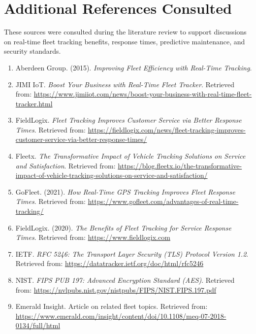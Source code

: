 \chapter{Additional References Consulted}

These sources were consulted during the literature review to support discussions on real-time fleet tracking benefits, response times, predictive maintenance, and security standards.

\begin{enumerate}
    \item Aberdeen Group. (2015). \textit{Improving Fleet Efficiency with Real-Time Tracking}.
    
    \item JIMI IoT. \textit{Boost Your Business with Real-Time Fleet Tracker}. Retrieved from: \url{https://www.jimiiot.com/news/boost-your-business-with-real-time-fleet-tracker.html}
    
    \item FieldLogix. \textit{Fleet Tracking Improves Customer Service via Better Response Times}. Retrieved from: \url{https://fieldlogix.com/news/fleet-tracking-improves-customer-service-via-better-response-times/}
    
    \item Fleetx. \textit{The Transformative Impact of Vehicle Tracking Solutions on Service and Satisfaction}. Retrieved from: \url{https://blog.fleetx.io/the-transformative-impact-of-vehicle-tracking-solutions-on-service-and-satisfaction/}
    
    \item GoFleet. (2021). \textit{How Real-Time GPS Tracking Improves Fleet Response Times}. Retrieved from: \url{https://www.gofleet.com/advantages-of-real-time-tracking/}
    
    \item FieldLogix. (2020). \textit{The Benefits of Fleet Tracking for Service Response Times}. Retrieved from: \url{https://www.fieldlogix.com}
    
    \item IETF. \textit{RFC 5246: The Transport Layer Security (TLS) Protocol Version 1.2}. Retrieved from: \url{https://datatracker.ietf.org/doc/html/rfc5246}
    
    \item NIST. \textit{FIPS PUB 197: Advanced Encryption Standard (AES)}. Retrieved from: \url{https://nvlpubs.nist.gov/nistpubs/FIPS/NIST.FIPS.197.pdf}
    
    \item Emerald Insight. Article on related fleet topics. Retrieved from: \url{https://www.emerald.com/insight/content/doi/10.1108/meq-07-2018-0134/full/html}
    

\end{enumerate}
